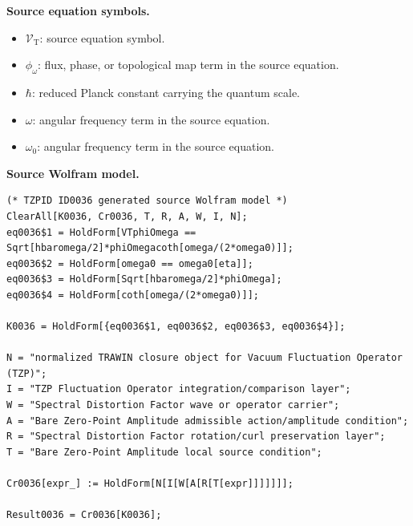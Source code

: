 \begin{minipage}[t]{0.49\linewidth}
\begingroup
\small
\raggedright
\textbf{Source equation symbols.}\par
\begin{itemize}[leftmargin=1.35em,itemsep=1pt,topsep=1pt,parsep=0pt]
    \item $\mathcal{V}_{\mathrm{T}}$: source equation symbol.
    \item $\phi_{\omega}$: flux, phase, or topological map term in the source equation.
    \item $\hbar$: reduced Planck constant carrying the quantum scale.
    \item $\omega$: angular frequency term in the source equation.
    \item $\omega_{0}$: angular frequency term in the source equation.
\end{itemize}
\endgroup
\end{minipage}\hfill
\begin{minipage}[t]{0.47\linewidth}
\begingroup
\scriptsize
\raggedright
\textbf{Source Wolfram model.}\par
\begin{Verbatim}[fontsize=\tiny,breaklines=true,breakanywhere=true]
(* TZPID ID0036 generated source Wolfram model *)
ClearAll[K0036, Cr0036, T, R, A, W, I, N];
eq0036$1 = HoldForm[VTphiOmega == Sqrt[hbaromega/2]*phiOmegacoth[omega/(2*omega0)]];
eq0036$2 = HoldForm[omega0 == omega0[eta]];
eq0036$3 = HoldForm[Sqrt[hbaromega/2]*phiOmega];
eq0036$4 = HoldForm[coth[omega/(2*omega0)]];

K0036 = HoldForm[{eq0036$1, eq0036$2, eq0036$3, eq0036$4}];

N = "normalized TRAWIN closure object for Vacuum Fluctuation Operator (TZP)";
I = "TZP Fluctuation Operator integration/comparison layer";
W = "Spectral Distortion Factor wave or operator carrier";
A = "Bare Zero-Point Amplitude admissible action/amplitude condition";
R = "Spectral Distortion Factor rotation/curl preservation layer";
T = "Bare Zero-Point Amplitude local source condition";

Cr0036[expr_] := HoldForm[N[I[W[A[R[T[expr]]]]]]];

Result0036 = Cr0036[K0036];
\end{Verbatim}
\endgroup
\end{minipage}

